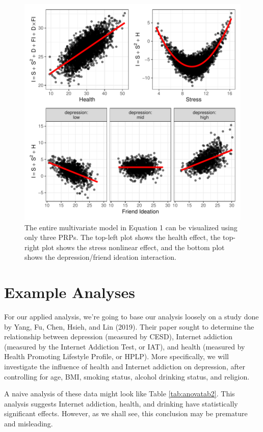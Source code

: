 \documentclass[
  man,floatsintext]{apa6}
\begin{document}
\begin{figure}

{\centering \includegraphics[width=0.75\linewidth]{visual_partitions_files/figure-latex/allplotstogether-1} 

}

\caption{The entire multivariate model in Equation 1 can be visualized using only three PRPs. The top-left plot shows the health effect, the top-right plot shows the stress nonlinear effect, and the bottom plot shows the depression/friend ideation interaction.}\label{fig:allplotstogether}
\end{figure}

\section{Example Analyses}\label{example-analyses}

For our applied analysis, we're going to base our analysis loosely on a study done by Yang, Fu, Chen, Hsieh, and Lin (2019). Their paper sought to determine the relationship between depression (measured by CESD), Internet addiction (measured by the Internet Addiction Test, or IAT), and health (measured by Health Promoting Lifestyle Profile, or HPLP). More specifically, we will investigate the influence of health and Internet addiction on depression, after controlling for age, BMI, smoking status, alcohol drinking status, and religion.

A naive analysis of these data might look like Table \ref{tab:anovatab2}. This analysis suggests Internet addiction, health, and drinking have statistically significant effects. However, as we shall see, this conclusion may be premature and misleading.
\end{document}
